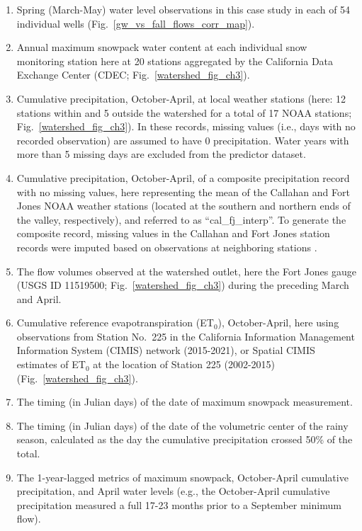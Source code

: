 \documentclass[hess, manuscript]{copernicus}
\providecommand{\tightlist}{%
  \setlength{\itemsep}{0pt}\setlength{\parskip}{0pt}}
\begin{document}
\begin{enumerate}
\def\labelenumi{\arabic{enumi}.}
\tightlist
\item
  Spring (March-May) water level observations in this case study in each
  of 54 individual wells (Fig.~\ref{gw_vs_fall_flows_corr_map}).
\item
  Annual maximum snowpack water content at each individual snow
  monitoring station here at 20 stations aggregated by the California
  Data Exchange Center (CDEC; Fig.~\ref{watershed_fig_ch3}).
\item
  Cumulative precipitation, October-April, at local weather stations
  (here: 12 stations within and 5 outside the watershed for a total of
  17 NOAA stations; Fig.~\ref{watershed_fig_ch3}). In these records,
  missing values (i.e., days with no recorded observation) are assumed
  to have 0 precipitation. Water years with more than 5 missing days are
  excluded from the predictor dataset.
\item
  Cumulative precipitation, October-April, of a composite precipitation
  record with no missing values, here representing the mean of the
  Callahan and Fort Jones NOAA weather stations (located at the southern
  and northern ends of the valley, respectively), and referred to as
  ``cal\_fj\_interp''. To generate the composite record, missing values
  in the Callahan and Fort Jones station records were imputed based on
  observations at neighboring stations \citep[see method
  in][]{Foglia2013a}.
\item
  The flow volumes observed at the watershed outlet, here the Fort Jones
  gauge (USGS ID 11519500; Fig.~\ref{watershed_fig_ch3}) during the
  preceding March and April.
\item
  Cumulative reference evapotranspiration (ET$_\mathrm{0}$),
  October-April, here using observations from Station No.~225 in the
  California Information Management Information System (CIMIS) network
  (2015-2021), or Spatial CIMIS estimates of ET$_\mathrm{0}$ at the
  location of Station 225 (2002-2015) (Fig.~\ref{watershed_fig_ch3}).
\item
  The timing (in Julian days) of the date of maximum snowpack
  measurement.
\item
  The timing (in Julian days) of the date of the volumetric center of
  the rainy season, calculated as the day the cumulative precipitation
  crossed 50\% of the total.
\item
  The 1-year-lagged metrics of maximum snowpack, October-April
  cumulative precipitation, and April water levels (e.g., the
  October-April cumulative precipitation measured a full 17-23 months
  prior to a September minimum flow).
\end{enumerate}
\end{document}
